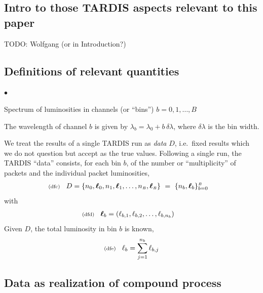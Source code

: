 \documentclass[11pt]{article}
\newcommand{\checked}{\todo[color=green,noline]{\checkmark}} %
\newcommand{\lleq}[1]{\label{#1} }
\renewcommand{\lleq}[1]{\label{#1} {\scriptstyle {\rm (#1)}} \hspace*{2ex} }
\newenvironment{mtemize}{
  \begin{list}{$\bullet$}
    {\setlength{\itemsep}{0pt}
     \setlength{\leftmargin}{3ex}
    }
  }
  {\end{list}}
\newcommand{\smB}{{\scriptscriptstyle B}}
\newcommand{\bml}{{\bm{\ell}}}
\begin{document}
\subsection{Intro to those TARDIS aspects relevant to this paper}

TODO: Wolfgang (or in Introduction?)

\subsection{Definitions of relevant quantities}

\begin{mtemize}
\item Spectrum of luminosities in channels (or ``bins'')
  $b=0,1,\ldots,B$
\item The wavelength of channel $b$ is given by $\lambda_b =
  \lambda_0 + b\,\delta\lambda$, where $\delta\lambda$ is the bin width.

\item We treat the results of a single TARDIS run as \textit{data}
  $D$, i.e.\ fixed results which we do not question but accept as the
  true values.  Following a single run, the TARDIS ``data'' consists,
  for each bin $b$, of the number or ``multiplicity'' of packets and
  the individual packet luminosities,
\begin{align}
  \lleq{dfc}
  D &= \{n_0,\bml_0,n_1,\bml_1,\ldots,n_\smB,\bml_\smB\}
  \ =\ \{n_b,\bml_b\}_{b=0}^\smB
\end{align}
  \checked{}
with
\begin{align}
  \lleq{dfd}
  \bml_b &= (\ell_{b,1},\ell_{b,2},\ldots,\ell_{b,n_b})
\end{align}
  \checked{}
Given $D$, the total luminosity in bin $b$ is known,
\begin{align}
  \lleq{dfe}
  \ell_b = \sum_{j=1}^{n_b}\ell_{b,j}
\end{align}
  \checked{}
\end{mtemize}

\subsection{Data as realization of compound process}
\end{document}

